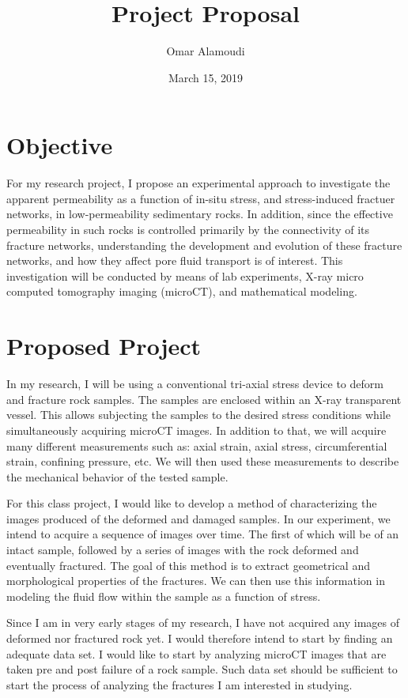 \documentclass[12pt]{article}
\title{Project Proposal}
\author{Omar Alamoudi}
\date{March 15, 2019}
\begin{document}
\maketitle

\section{Objective}
For my research project, I propose an experimental approach to investigate the apparent permeability as a function of in-situ stress, and stress-induced fractuer networks, in low-permeability sedimentary rocks. In addition, since the effective permeability in such rocks is controlled primarily by the connectivity of its fracture networks, understanding the development and evolution of these fracture networks, and how they affect pore fluid transport is of interest. This investigation will be conducted by means of lab experiments, X-ray micro computed tomography imaging (microCT), and mathematical modeling. 

\section{Proposed Project}
In my research, I will be using a conventional tri-axial stress device to deform and fracture rock samples. The samples are enclosed within an X-ray transparent vessel. This allows subjecting the samples to the desired stress conditions while simultaneously acquiring microCT images. In addition to that, we will acquire many different measurements such as: axial strain, axial stress, circumferential strain, confining pressure, etc. We will then used these measurements to describe the mechanical behavior of the tested sample. 

For this class project, I would like to develop a method of characterizing the images produced of the deformed and damaged samples. In our experiment, we intend to acquire a sequence of images over time. The first of which will be of an intact sample, followed by a series of images with the rock deformed and eventually fractured. The goal of this method is to extract geometrical and morphological properties of the fractures. We can then use this information in modeling the fluid flow within the sample as a function of stress.

Since I am in very early stages of my research, I have not acquired any images of deformed nor fractured rock yet. I would therefore intend to start by finding an adequate data set. I would like to start by analyzing microCT images that are taken pre and post failure of a rock sample. Such data set should be sufficient to start the process of analyzing the fractures I am interested in studying.
\end{document}
